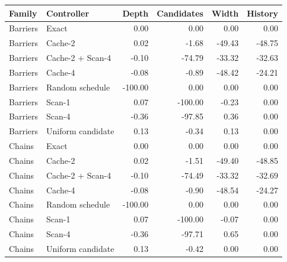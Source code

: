 \begin{tabular}{llrrrr}
\toprule
Family & Controller & Depth & Candidates & Width & History\\
\midrule
Barriers & Exact & 0.00 & 0.00 & 0.00 & 0.00\\
Barriers & Cache-2 & 0.02 & -1.68 & -49.43 & -48.75\\
Barriers & Cache-2 + Scan-4 & -0.10 & -74.79 & -33.32 & -32.63\\
Barriers & Cache-4 & -0.08 & -0.89 & -48.42 & -24.21\\
Barriers & Random schedule & -100.00 & 0.00 & 0.00 & 0.00\\
Barriers & Scan-1 & 0.07 & -100.00 & -0.23 & 0.00\\
Barriers & Scan-4 & -0.36 & -97.85 & 0.36 & 0.00\\
Barriers & Uniform candidate & 0.13 & -0.34 & 0.13 & 0.00\\
Chains & Exact & 0.00 & 0.00 & 0.00 & 0.00\\
Chains & Cache-2 & 0.02 & -1.51 & -49.40 & -48.85\\
Chains & Cache-2 + Scan-4 & -0.10 & -74.49 & -33.32 & -32.69\\
Chains & Cache-4 & -0.08 & -0.90 & -48.54 & -24.27\\
Chains & Random schedule & -100.00 & 0.00 & 0.00 & 0.00\\
Chains & Scan-1 & 0.07 & -100.00 & -0.07 & 0.00\\
Chains & Scan-4 & -0.36 & -97.71 & 0.65 & 0.00\\
Chains & Uniform candidate & 0.13 & -0.42 & 0.00 & 0.00\\
\bottomrule
\end{tabular}